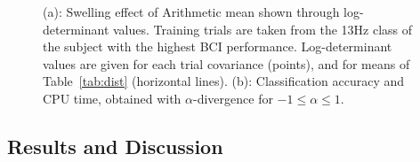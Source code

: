 \begin{figure}[h!]
\centering
{}
\caption{(a): Swelling effect of Arithmetic mean shown through log-determinant values. Training trials are taken from the 13Hz class of the subject with the highest BCI performance. Log-determinant values are given for each trial covariance (points), and for means of Table~\ref{tab:dist} (horizontal lines). (b): Classification accuracy and CPU time, obtained with $\alpha$-divergence for $-1\leqslant \alpha  \leqslant 1$.} 
\label{fig:swel_alpha}
\end{figure} 

\subsection{Results and Discussion}

\iflatexml\else {} \fi
